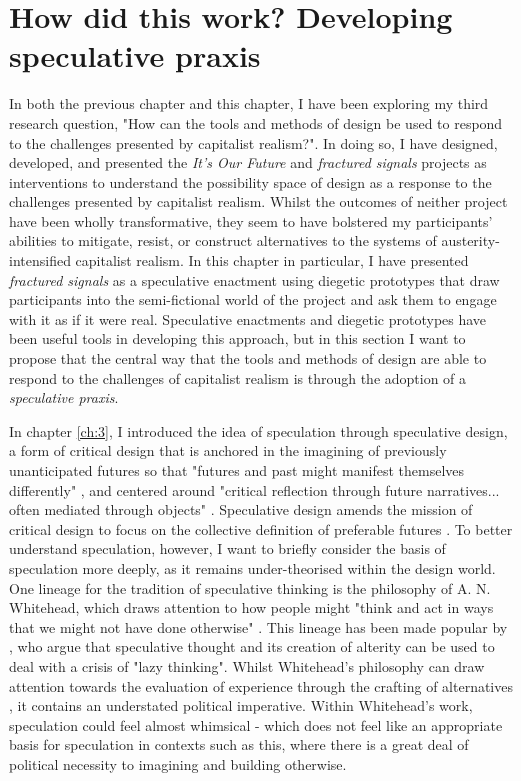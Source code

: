 \section{How did this work? Developing speculative praxis}

In both the previous chapter and this chapter, I have been exploring my third research question, "How can the tools and methods of design be used to respond to the challenges presented by capitalist realism?". In doing so, I have designed, developed, and presented the \textit{It's Our Future} and \textit{fractured signals} projects as interventions to understand the possibility space of design as a response to the challenges presented by capitalist realism. Whilst the outcomes of neither project have been wholly transformative, they seem to have bolstered my participants' abilities to mitigate, resist, or construct alternatives to the systems of austerity-intensified capitalist realism. In this chapter in particular, I have presented \textit{fractured signals} as a speculative enactment using diegetic prototypes that draw participants into the semi-fictional world of the project and ask them to engage with it as if it were real. Speculative enactments and diegetic prototypes have been useful tools in developing this approach, but in this section I want to propose that the central way that the tools and methods of design are able to respond to the challenges of capitalist realism is through the adoption of a \textit{speculative praxis}.

In chapter \ref{ch:3}, I introduced the idea of speculation through speculative design, a form of critical design that is anchored in the imagining of previously unanticipated futures so that "futures and past might manifest themselves differently" \citep{gatehouse_hauntology_2020}, and centered around "critical reflection through future narratives... often mediated through objects" \citep{forlano_ethnographies_2013}. Speculative design amends the mission of critical design to focus on the collective definition of preferable futures \cite[6]{dunne_speculative_2013}. To better understand speculation, however, I want to briefly consider the basis of speculation more deeply, as it remains under-theorised within the design world. One lineage for the tradition of speculative thinking is the philosophy of A. N. Whitehead, which draws attention to how people might "think and act in ways that we might not have done otherwise" \citep[2]{shaviro_defining_2019}. This lineage has been made popular by \citet[14]{debaise_insistence_2016}, who argue that speculative thought and its creation of alterity can be used to deal with a crisis of "lazy thinking". Whilst Whitehead's philosophy can draw attention towards the evaluation of experience through the crafting of alternatives \citep[2]{williams_abstract_2022}, it contains an understated political imperative. Within Whitehead's work, speculation could feel almost whimsical - which does not feel like an appropriate basis for speculation in contexts such as this, where there is a great deal of political necessity to imagining and building otherwise. 


